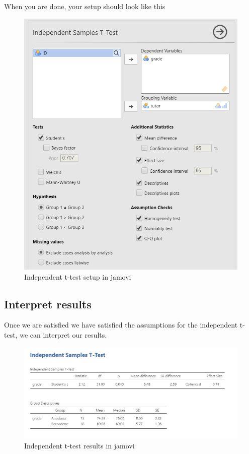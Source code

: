 \documentclass[
]{book}
\begin{document}
When you are done, your setup should look like this

\begin{figure}

{\centering \includegraphics[width=0.8\linewidth]{images/02-independent_t-test/independent_t-test_setup} 

}

\caption{Independent t-test setup in jamovi}\label{fig:unnamed-chunk-7}
\end{figure}

\hypertarget{interpret-results-1}{%
\subsection{Interpret results}\label{interpret-results-1}}

Once we are satisfied we have satisfied the assumptions for the independent t-test, we can interpret our results.

\begin{figure}

{\centering \includegraphics[width=1\linewidth]{images/02-independent_t-test/independent_t-test_ind-results} 

}

\caption{Independent t-test results in jamovi}\label{fig:unnamed-chunk-8}
\end{figure}
\end{document}
